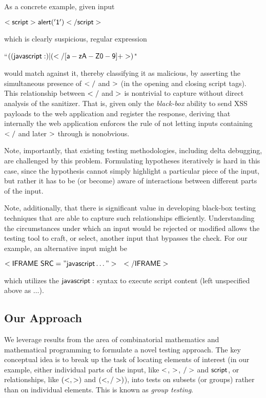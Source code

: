 As a concrete example, given input 
\begin{center}
$\sf{<script>alert('1')</script>}$
\end{center}
which is clearly suspicious, regular expression
\begin{center}
``$\sf{((javascript:)|(</[a-zA-Z0-9]+>)}$"
\end{center}
would match against it, thereby classifying it as malicious, by asserting the simultaneous presence of ${\sf </}$ and ${\sf >}$ (in the opening and closing {\sf script} tags). This relationship between ${\sf </}$ and ${\sf >}$ is nontrivial to capture without direct analysis of the sanitizer. That is, given only the \emph{black-box} ability to send XSS payloads to the web application and register the response, deriving that internally the web application enforces the rule of not letting inputs containing ${\sf </}$ and later ${\sf >}$ through is nonobvious.

Note, importantly, that existing testing methodologies, including delta debugging, are challenged by this problem. Formulating hypotheses iteratively is hard in this case, since the hypothesis cannot simply highlight a particular piece of the input, but rather it has to be (or become) aware of interactions between different parts of the input.

Note, additionally, that there is significant value in developing black-box testing techniques that are able to capture such relationships efficiently. Understanding the circumstances under which an input would be rejected or modified allows the testing tool to craft, or select, another input that bypasses the check. For our example, an alternative input might be
\begin{center}
	${\sf <IFRAME~SRC="javascript\ldots">\quad\sf </IFRAME>}$
	\end{center}
which utilizes the ${\sf javascript:}$ syntax to execute script content (left unspecified above as $\ldots$).

\subsection{Our Approach} We leverage results from the area of combinatorial mathematics and mathematical programming to formulate a novel testing approach. The key conceptual idea is to break up the task of locating elements of interest (in our example, either individual parts of the input, like ${\sf <}$,
${\sf >}$, ${\sf />}$ and ${\sf script}$, or relationships, like ${\sf (<,>)}$ and ${\sf (<,/>)}$), into tests on subsets (or groups) rather than on individual elements. This is known as \emph{group testing}.

